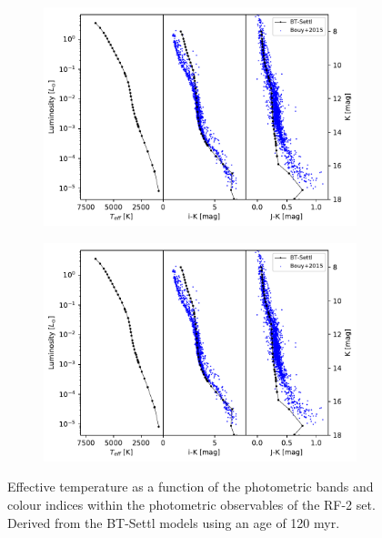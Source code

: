 \begin{figure}[htp!]
\begin{center} 
\begin{subfigure}[t]{0.48\textwidth}
\includegraphics[page=2,width=\textwidth]{background/Figures/BT-Settl-2011bc-120Myr_Teff_vs_phot.pdf}
\end{subfigure}
 \begin{subfigure}[t]{0.48\textwidth}
\includegraphics[page=3,width=\textwidth]{background/Figures/BT-Settl-2011bc-120Myr_Teff_vs_phot.pdf}
\end{subfigure}
\caption{Effective temperature as a function of the photometric bands and colour indices within the photometric observables of the RF-2 set. Derived from the BT-Settl models \citep{2014IAUS..299..271A} using an age of 120 \gls{myr}.}
\label{fig:Teff_vs_colours}
\end{center}
\end{figure}



